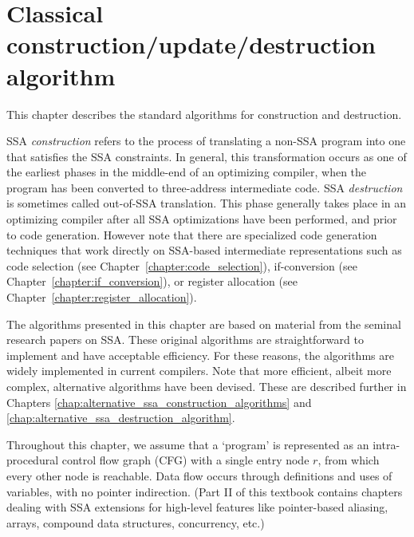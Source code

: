 \chapter{Classical construction/update/destruction algorithm }
\label{chap:classical_construction}


\def\phiops{$\phi$-functions}
\def\phiop{$\phi$-function}


This chapter describes the standard algorithms for construction and
destruction.

SSA \emph{construction} refers to the process of translating a non-SSA program into
one that satisfies the SSA constraints. In general, this transformation
occurs as one of the
earliest phases in the middle-end of an optimizing compiler, when the program
has been converted to three-address intermediate code.
SSA \emph{destruction} is sometimes called out-of-SSA translation. This phase
generally
takes place in an optimizing compiler after all SSA optimizations have
been performed, and prior to code generation. However note that there are
specialized code generation techniques that work directly on SSA-based
intermediate representations such as code selection (see Chapter~\ref{chapter:code_selection}), if-conversion (see Chapter~\ref{chapter:if_conversion}), or register allocation (see Chapter~\ref{chapter:register_allocation}).

The algorithms presented in this chapter are
based on material from the seminal research papers on SSA.
These original algorithms are 
straightforward to implement and have acceptable efficiency.
For these reasons, the algorithms
are widely implemented in current compilers.
Note that more
efficient, albeit more complex, alternative algorithms have been devised.
These are described further in Chapters 
\ref{chap:alternative_ssa_construction_algorithms}
and
\ref{chap:alternative_ssa_destruction_algorithm}.

Throughout this chapter,
we assume that a `program' is represented as an
intra-procedural control flow graph (CFG)
with a single entry node $r$, from which every other
node is reachable.
Data flow occurs through definitions and uses of 
variables, with no pointer indirection.
(Part II of this textbook contains chapters dealing with
SSA extensions for high-level features like
pointer-based aliasing, arrays, compound data structures, concurrency, etc.)



